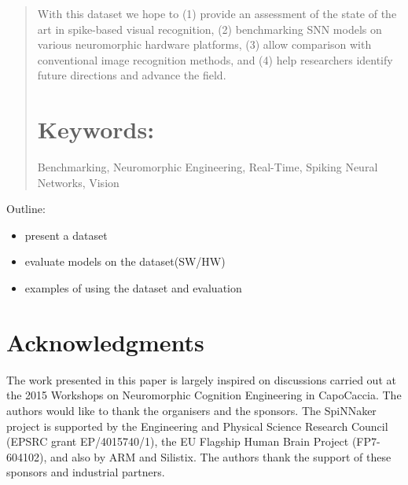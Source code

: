 \documentclass[pdftex]{bioinfo}
\begin{document}
\begin{abstract}
With this dataset we hope to (1) provide an assessment of the state of the art in spike-based visual recognition, (2) benchmarking SNN models on various neuromorphic hardware platforms, (3) allow comparison with conventional image recognition methods, and (4) help researchers identify future directions and advance the field.

\tiny
\section{Keywords:} Benchmarking, Neuromorphic Engineering, Real-Time, Spiking Neural Networks, Vision
\end{abstract}

Outline:
\begin{itemize}
	\item present a dataset
	\item evaluate models on the dataset(SW/HW)
	\item examples of using the dataset and evaluation
\end{itemize}







\section*{Acknowledgments}
The work presented in this paper is largely inspired on discussions carried out at the 2015 Workshops on Neuromorphic Cognition Engineering in CapoCaccia.
The authors would like to thank the organisers and the sponsors.
The SpiNNaker project is supported by the Engineering and Physical Science Research Council (EPSRC grant EP/4015740/1), the EU Flagship Human Brain Project (FP7-604102), and also by ARM and Silistix.
The authors thank the support of these sponsors and industrial partners.


\end{document}
